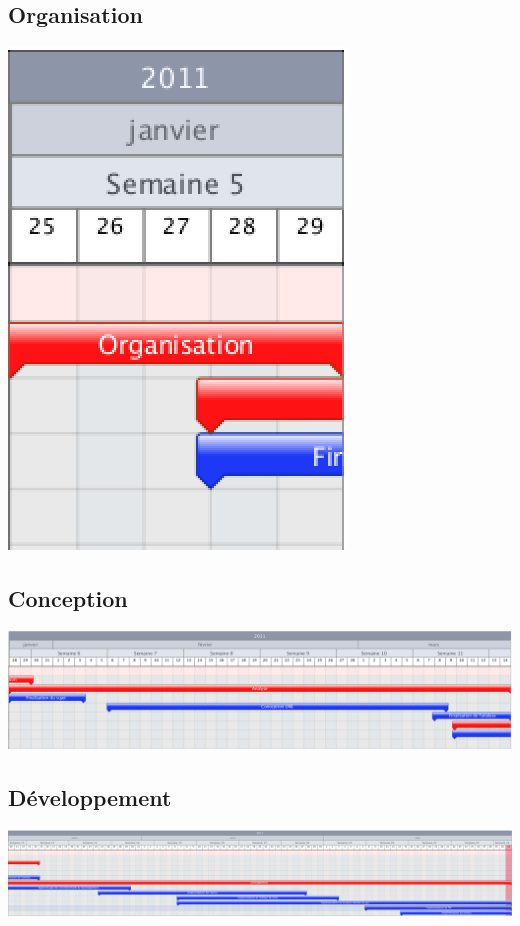 	\subsection*{Organisation}
		\begin{center}
			\includegraphics{./Organisation/Img/BomberBlok-Organisation.eps}
		\end{center}
	
	\subsection*{Conception}
		\begin{center}
			\includegraphics[width=20cm, angle=90]{./Organisation/Img/BomberBlok-Conception.eps}
		\end{center}
	
	\subsection*{Développement}
		\begin{center}
			\includegraphics[width=20cm, angle=90]{./Organisation/Img/BomberBlok-Developpement.eps}
		\end{center}